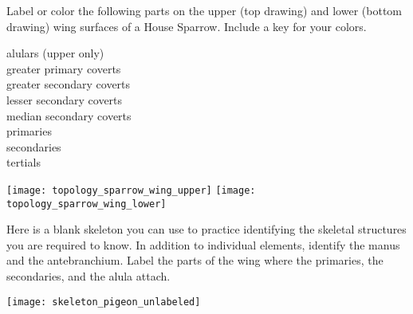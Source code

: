 \documentclass[10pt]{article}
\begin{document}
Label or color the following parts on the upper (top drawing) and lower (bottom drawing) wing surfaces of a House Sparrow. Include a key for your colors.


\begin{multicols}{3}
alulars (upper only)\\
greater primary coverts\\
greater secondary coverts\\
lesser secondary coverts\\
median secondary coverts\\
primaries\\
secondaries\\
tertials
\end{multicols}

\vspace{\baselineskip}

\begin{center}
\texttt{[image: topology\_sparrow\_wing\_upper]}
\hfill 
\texttt{[image: topology\_sparrow\_wing\_lower]}


\end{center}

%
%
%
%
%
%





\newpage

Here is a blank skeleton you can use to practice identifying the skeletal structures you are required to know. In addition to individual elements, identify the manus and the antebranchium. Label the parts of the wing where the primaries, the secondaries, and the alula attach.

\vfill

\begin{center}
	\texttt{[image: skeleton\_pigeon\_unlabeled]}
	
\end{center}

\vfill
\end{document}
